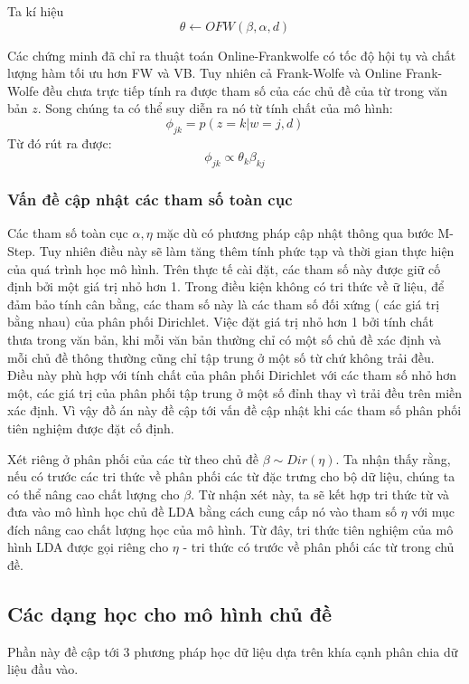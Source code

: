 \documentclass[fontsize=13pt]{scrartcl}
\begin{document}
Ta kí hiệu 
\begin{equation}
\theta \leftarrow OFW(\beta,\alpha,d)
\end{equation}

Các chứng minh đã chỉ ra thuật toán Online-Frankwolfe có tốc độ hội tụ và chất lượng hàm tối ưu hơn FW và VB. Tuy nhiên cả Frank-Wolfe và Online Frank-Wolfe đều chưa trực tiếp tính ra được tham số của các chủ đề của từ trong văn bản $z$. Song chúng ta có thể suy diễn ra nó từ tính chất của mô hình:
\begin{equation}
\phi_{jk} = p(z = k | w = j, d)
\end{equation}
Từ đó rút ra được:
\begin{equation}
\phi_{jk} \propto \theta_{k}\beta_{kj}
\end{equation}

\subsubsection{Vấn đề cập nhật các tham số toàn cục}
Các tham số toàn cục $\alpha,\eta$ mặc dù có phương pháp cập nhật thông qua bước M-Step. Tuy nhiên điều này sẽ làm tăng thêm tính phức tạp và thời gian thực hiện của quá trình học mô hình. Trên thực tế cài đặt, các tham số này được giữ cố định bởi một giá trị nhỏ hơn 1. Trong điều kiện không có tri thức về ữ liệu, để đảm bảo tính cân bằng, các tham số này là các tham số đối xứng ( các giá trị bằng nhau) của phân phối Dirichlet. Việc đặt giá trị nhỏ hơn 1 bởi tính chất thưa trong văn bản, khi mỗi văn bản thường chỉ có một số chủ đề xác định và mỗi chủ đề thông thường cũng chỉ tập trung ở một số từ chứ không trải đều. Điều này phù hợp với tính chất của phân phối Dirichlet với các tham số nhỏ hơn một, các giá trị của phân phối tập trung ở một số đỉnh thay vì trải đều trên miền xác định. Vì vậy đồ án này đề cập tới vấn đề cập nhật khi các tham số phân phối tiên nghiệm được đặt cố định.
\par
Xét riêng ở phân phối của các từ theo chủ đề $\beta \sim Dir(\eta)$. Ta nhận thấy rằng, nếu có trước các tri thức về phân phối các từ đặc trưng cho bộ dữ liệu, chúng ta có thể nâng cao chất lượng cho $\beta$.  Từ nhận xét này, ta sẽ kết hợp tri thức từ và đưa vào mô hình học chủ đề LDA bằng cách cung cấp nó vào tham số $\eta$ với mục đích nâng cao chất lượng học của mô hình. Từ đây,  tri thức tiên nghiệm của mô hình LDA được gọi riêng cho $\eta$ - tri thức có trước về phân phối các từ trong chủ đề.  
\subsection{Các dạng học cho mô hình chủ đề}
Phần này đề cập tới 3 phương pháp học dữ liệu dựa trên khía cạnh phân chia dữ liệu đầu vào.
\end{document}
